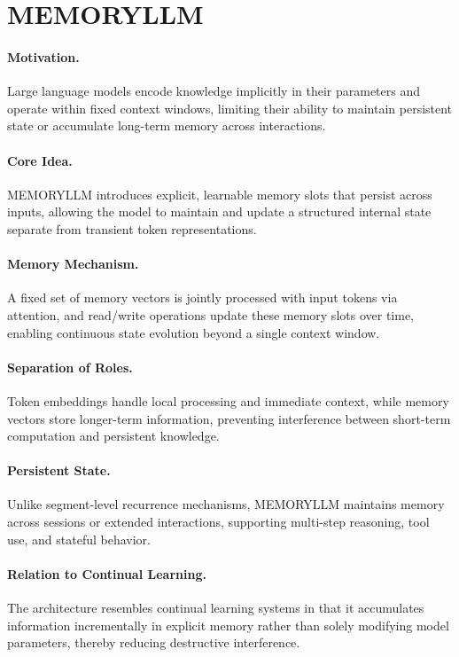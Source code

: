 \documentclass[12pt]{article}
\begin{document}
\psetheader %

\section*{MEMORYLLM}

\paragraph{Motivation.}
Large language models encode knowledge implicitly in their parameters and operate within fixed context
windows, limiting their ability to maintain persistent state or accumulate long-term memory across interactions.

\paragraph{Core Idea.}
MEMORYLLM introduces explicit, learnable memory slots that persist across inputs, allowing the model to
maintain and update a structured internal state separate from transient token representations.

\paragraph{Memory Mechanism.}
A fixed set of memory vectors is jointly processed with input tokens via attention, and read/write operations
update these memory slots over time, enabling continuous state evolution beyond a single context window.

\paragraph{Separation of Roles.}
Token embeddings handle local processing and immediate context, while memory vectors store longer-term
information, preventing interference between short-term computation and persistent knowledge.

\paragraph{Persistent State.}
Unlike segment-level recurrence mechanisms, MEMORYLLM maintains memory across sessions or extended
interactions, supporting multi-step reasoning, tool use, and stateful behavior.

\paragraph{Relation to Continual Learning.}
The architecture resembles continual learning systems in that it accumulates information incrementally in
explicit memory rather than solely modifying model parameters, thereby reducing destructive interference.
\end{document}
